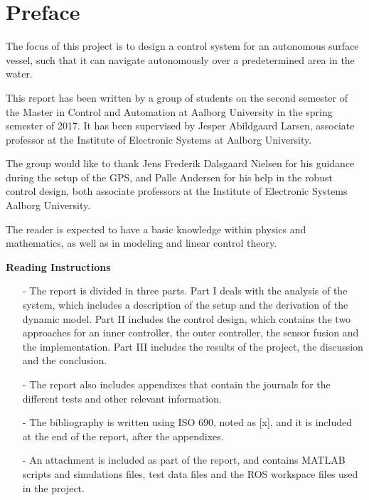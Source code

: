 \chapter*{Preface}
\vspace{-12 pt}
The focus of this project is to design a control system for an autonomous surface vessel, such that it can navigate autonomously over a predetermined area in the water.

This report has been written by a group of students on the second semester of the Master in Control and Automation at Aalborg University in the spring semester of 2017. It has been supervised by Jesper Abildgaard Larsen, associate professor at the Institute of Electronic Systems at Aalborg University. 

The group would like to thank Jens Frederik Dalsgaard Nielsen for his guidance during the setup of the GPS, and Palle Andersen for his help in the robust control design, both associate professors at the Institute of Electronic Systems Aalborg University.

The reader is expected to have a basic knowledge within physics and mathematics, as well as in modeling and linear control theory.

\textbf{Reading Instructions}
\vspace{-10 pt}
\begin{itemize}
    \item[-] The report is divided in three parts. Part I deals with the analysis of the system, which includes a description of the setup and the derivation of the dynamic model. Part II includes the control design, which contains the two approaches for an inner controller, the outer controller, the sensor fusion and the implementation. Part III includes the results of the project, the discussion and the conclusion.
    \item[-] The report also includes appendixes that contain the journals for the different tests and other relevant information.
    \item[-] The bibliography is written using ISO 690, noted as [x], and it is included at the end of the report, after the appendixes.
    \item[-] An attachment is included as part of the report, and contains MATLAB scripts and simulations files, test data files and the ROS workspace files used in the project.
\end{itemize}

